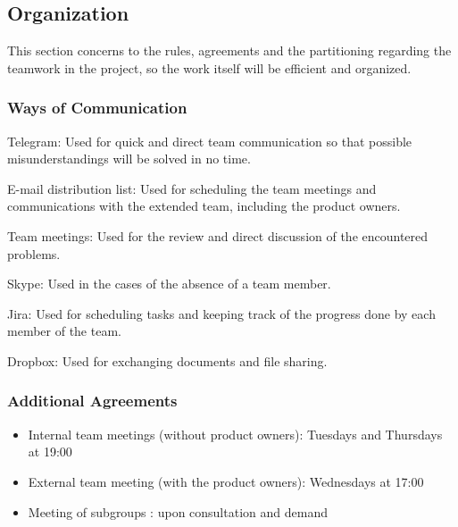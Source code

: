 \subsection{Organization}

This section concerns to the rules, agreements and the partitioning regarding the teamwork in the project, so the work itself will be efficient and organized. 

\subsubsection{Ways of Communication}
\begin{aims}
	\item[Telegram:] Used for quick and direct team communication so that possible misunderstandings will be solved in no time.
	
	\item[E-mail distribution list:] Used for scheduling the team meetings and communications with the extended team, including the product owners. 
	
	\item[Team meetings:] Used for the review and direct discussion of the encountered problems. 
	
	\item[Skype:] Used in the cases of the absence of a team member. 
	
	\item [Jira:] Used for scheduling tasks and keeping track of the progress done by each member of the team.
	
	\item[Dropbox:] Used for exchanging documents and file sharing.  
\end{aims}

\subsubsection{Additional Agreements}
\begin{itemize}
	\item Internal team meetings (without product owners): Tuesdays and Thursdays at 19:00
	
	\item External team meeting (with the product owners): Wednesdays at 17:00
	
	\item Meeting of subgroups : upon consultation and demand 
\end{itemize}

